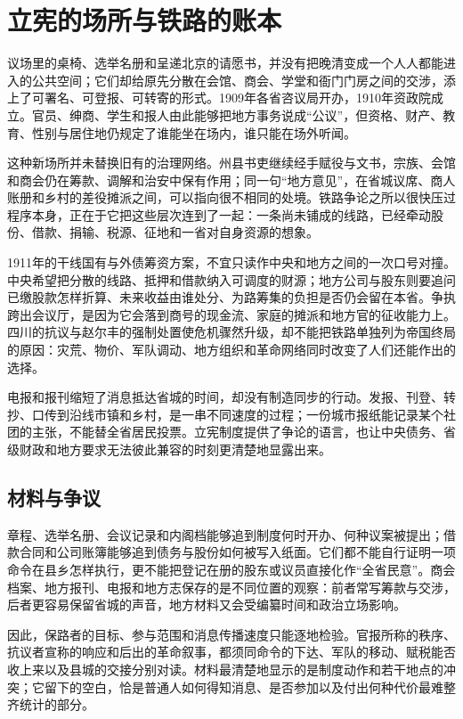 \section{立宪的场所与铁路的账本}

议场里的桌椅、选举名册和呈递北京的请愿书，并没有把晚清变成一个人人都能进入的公共空间；它们却给原先分散在会馆、商会、学堂和衙门门房之间的交涉，添上了可署名、可登报、可转寄的形式。1909年各省咨议局开办，1910年资政院成立。官员、绅商、学生和报人由此能够把地方事务说成“公议”，但资格、财产、教育、性别与居住地仍规定了谁能坐在场内，谁只能在场外听闻。

这种新场所并未替换旧有的治理网络。州县书吏继续经手赋役与文书，宗族、会馆和商会仍在筹款、调解和治安中保有作用；同一句“地方意见”，在省城议席、商人账册和乡村的差役摊派之间，可以指向很不相同的处境。铁路争论之所以很快压过程序本身，正在于它把这些层次连到了一起：一条尚未铺成的线路，已经牵动股份、借款、捐输、税源、征地和一省对自身资源的想象。

1911年的干线国有与外债筹资方案，不宜只读作中央和地方之间的一次口号对撞。中央希望把分散的线路、抵押和借款纳入可调度的财源；地方公司与股东则要追问已缴股款怎样折算、未来收益由谁处分、为路筹集的负担是否仍会留在本省。争执跨出会议厅，是因为它会落到商号的现金流、家庭的摊派和地方官的征收能力上。四川的抗议与赵尔丰的强制处置使危机骤然升级，却不能把铁路单独列为帝国终局的原因：灾荒、物价、军队调动、地方组织和革命网络同时改变了人们还能作出的选择。

电报和报刊缩短了消息抵达省城的时间，却没有制造同步的行动。发报、刊登、转抄、口传到沿线市镇和乡村，是一串不同速度的过程；一份城市报纸能记录某个社团的主张，不能替全省居民投票。立宪制度提供了争论的语言，也让中央债务、省级财政和地方要求无法彼此兼容的时刻更清楚地显露出来。

\subsection{材料与争议}

章程、选举名册、会议记录和内阁档能够追到制度何时开办、何种议案被提出；借款合同和公司账簿能够追到债务与股份如何被写入纸面。它们都不能自行证明一项命令在县乡怎样执行，更不能把登记在册的股东或议员直接化作“全省民意”。商会档案、地方报刊、电报和地方志保存的是不同位置的观察：前者常写筹款与交涉，后者更容易保留省城的声音，地方材料又会受编纂时间和政治立场影响。

因此，保路者的目标、参与范围和消息传播速度只能逐地检验。官报所称的秩序、抗议者宣称的响应和后出的革命叙事，都须同命令的下达、军队的移动、赋税能否收上来以及县城的交接分别对读。材料最清楚地显示的是制度动作和若干地点的冲突；它留下的空白，恰是普通人如何得知消息、是否参加以及付出何种代价最难整齐统计的部分。

